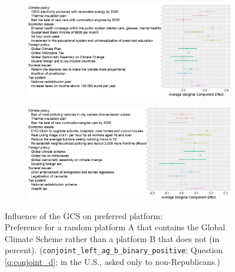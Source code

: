 \documentclass[12pt,english]{article}
\begin{document}
\begin{bibunit}
\begin{figure}[h!]
\begin{subfigure}{\textwidth}
    \end{subfigure}
    \begin{subfigure}{\textwidth}
      \includegraphics[width=\textwidth]{../figures/ES/ca_r_en.png}
    \end{subfigure}
    \begin{subfigure}{\textwidth}
      \includegraphics[width=\textwidth]{../figures/UK/ca_r.png}
    \end{subfigure}
  \end{figure}
  
  \begin{figure}[h!]
    \cprotect\caption[Influence of the GCS on preferred platform]{Influence of the GCS on preferred platform:\\ Preference for a random platform A that contains the Global Climate Scheme rather than a platform B that does not (in percent). (\verb|conjoint_left_ag_b_binary_positive|; Question \ref{q:conjoint_d}; in the U.S., asked only to non-Republicans.)}\label{fig:conjoint_left_ag_b}
  \end{figure}
  

\end{bibunit}
\end{document}
